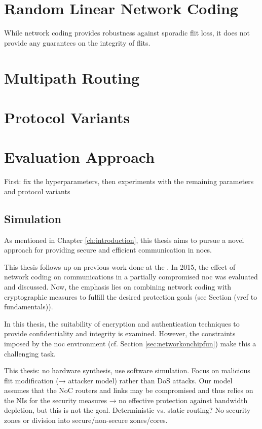 \section{Random Linear Network Coding}
While network coding provides robustness against sporadic flit loss, it does not provide any guarantees on the integrity of flits.

\section{Multipath Routing}

\section{Protocol Variants}

\section{Evaluation Approach}
First: fix the hyperparameters, then experiments with the remaining parameters and protocol variants
\subsection{Simulation}



As mentioned in Chapter \ref{ch:introduction}, this thesis aims to pursue a novel approach for providing secure and efficient communication in
\glspl{noc}.

This thesis follows up on previous work done at the \thechair. In 2015, the effect of network coding
on communications in a partially compromised \gls{noc} was evaluated and discussed. Now, the emphasis lies on combining network coding with
cryptographic measures to fulfill the desired protection goals (see Section (vref to fundamentals)). %

In this thesis, the suitability of encryption and authentication techniques to provide confidentiality and integrity is examined. However, the
constraints imposed by the \gls{noc} environment (cf. Section \ref{sec:networkonchipfun}) make this a challenging task.

This thesis: no hardware synthesis, use software simulation. Focus on malicious flit modification (→ attacker model) rather than DoS attacks. Our
model assumes that the NoC routers and links may be compromised and thus relies on the NIs for the security measures → no effective protection
against bandwidth depletion, but this is not the goal.
Deterministic vs. static routing? No security zones or division into secure/non-secure zones/cores.

